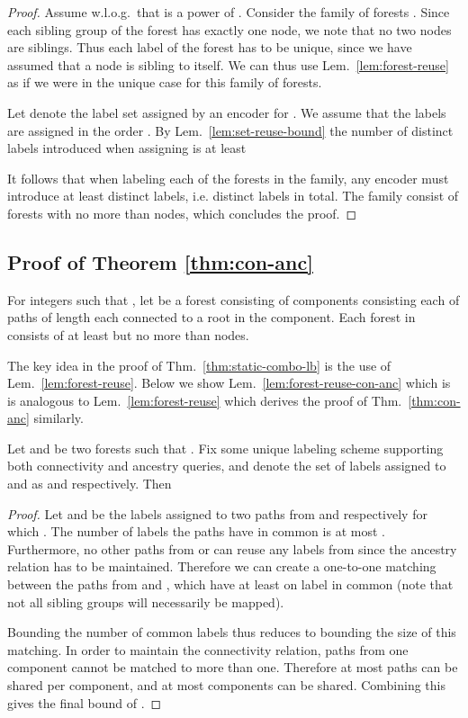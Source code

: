 \documentclass{llncs}
\begin{document}
\begin{proof}
    Assume w.l.o.g.~that  is a power of .
    Consider the family of  forests  . Since each sibling group of
    the forest  has exactly one node, we note that no two
    nodes are siblings. Thus each label of the forest has to be unique, since
    we have assumed that a node is sibling to itself. We can thus use
    Lem.~\ref{lem:forest-reuse} as if we were in the unique case for this
    family of forests.

    Let  denote the label set assigned by an encoder for
    . We  assume that the labels are assigned in the order
    . By Lem.~\ref{lem:set-reuse-bound} the number of
    distinct labels introduced when assigning  is at least
    
    It follows that when labeling each of the  forests in the family,
    any encoder must introduce at least  distinct labels, i.e. 
    distinct labels in total.
    The family consist of forests with no more than  nodes, which
    concludes the proof.
\end{proof}


\subsection{Proof of Theorem \ref{thm:con-anc}} \label{proof:con-anc}

For integers  such that , let  be  a forest
consisting of  components consisting each  of  paths of length
 each connected to a root in the component. Each forest in  consists of at least
 but no more than  nodes.

The key idea in the proof of Thm.~\ref{thm:static-combo-lb} is the use of
Lem.~\ref{lem:forest-reuse}. Below we show  Lem.~\ref{lem:forest-reuse-con-anc}
which is is analogous to Lem.~\ref{lem:forest-reuse} which derives the proof of  Thm.~\ref{thm:con-anc} similarly.

\begin{lemma}\label{lem:forest-reuse-con-anc}
    Let  and  be two forests such that .
    Fix some unique labeling scheme supporting both
    connectivity and ancestry queries, and denote the set of labels assigned to
     and  as  and  respectively.
	Then
    
\end{lemma}
\begin{proof}
	Let  and  be the labels assigned to two paths from  and
	 respectively for which .
	The number of labels the paths have in common is at most
	.
	Furthermore,
	no other paths from  or  can reuse any labels from
	 since the ancestry relation has to be maintained. Therefore
	we can create a one-to-one matching between the paths from  and
    ,
    which have at least on label in common (note that not all sibling groups will
    necessarily be mapped).

    Bounding the number of common labels thus reduces to
    bounding the size of this matching.
    In order to  maintain the connectivity relation, paths from one
    component cannot be matched to more than one. Therefore at most 
    paths can be shared per component, and at most  components
    can be shared. Combining this gives the final bound of
    .
\end{proof}
\end{document}
